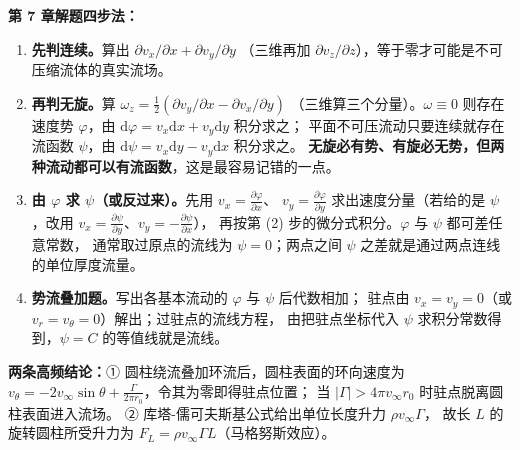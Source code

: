 \begin{banfa}
\textbf{第 7 章解题四步法：}
\begin{enumerate}[label=(\arabic*),leftmargin=1.9em,itemsep=2pt]
  \item \textbf{先判连续。}算出 $\partial v_x/\partial x+\partial v_y/\partial y$
        （三维再加 $\partial v_z/\partial z$），等于零才可能是不可压缩流体的真实流场。
  \item \textbf{再判无旋。}算 $\omega_z=\frac{1}{2}\left(\partial v_y/\partial x-\partial v_x/\partial y\right)$
        （三维算三个分量）。$\omega\equiv0$ 则存在速度势 $\varphi$，由
        $\mathrm{d}\varphi=v_x\mathrm{d}x+v_y\mathrm{d}y$ 积分求之；
        平面不可压流动只要连续就存在流函数 $\psi$，由
        $\mathrm{d}\psi=v_x\mathrm{d}y-v_y\mathrm{d}x$ 积分求之。
        \textbf{无旋必有势、有旋必无势，但两种流动都可以有流函数}，这是最容易记错的一点。
  \item \textbf{由 $\varphi$ 求 $\psi$（或反过来）。}先用 $v_x=\frac{\partial\varphi}{\partial x}$、
        $v_y=\frac{\partial\varphi}{\partial y}$ 求出速度分量（若给的是 $\psi$，改用
        $v_x=\frac{\partial\psi}{\partial y}$、$v_y=-\frac{\partial\psi}{\partial x}$），
        再按第 (2) 步的微分式积分。$\varphi$ 与 $\psi$ 都可差任意常数，
        通常取过原点的流线为 $\psi=0$；两点之间 $\psi$ 之差就是通过两点连线的单位厚度流量。
  \item \textbf{势流叠加题。}写出各基本流动的 $\varphi$ 与 $\psi$ 后代数相加；
        驻点由 $v_x=v_y=0$（或 $v_r=v_\theta=0$）解出；过驻点的流线方程，
        由把驻点坐标代入 $\psi$ 求积分常数得到，$\psi=C$ 的等值线就是流线。
\end{enumerate}
\textbf{两条高频结论：}① 圆柱绕流叠加环流后，圆柱表面的环向速度为
$v_\theta=-2v_\infty\sin\theta+\frac{\Gamma}{2\pi r_0}$，令其为零即得驻点位置；
当 $|\Gamma|>4\pi v_\infty r_0$ 时驻点脱离圆柱表面进入流场。
② 库塔-儒可夫斯基公式给出单位长度升力 $\rho v_\infty\Gamma$，
故长 $L$ 的旋转圆柱所受升力为 $F_L=\rho v_\infty\Gamma L$（马格努斯效应）。
\end{banfa}
